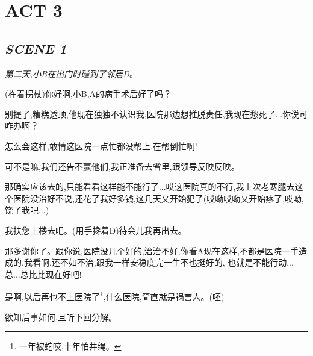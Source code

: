 \documentclass[11pt,a4paper,oneside]{memoir}  %
\begin{document}
\chapter*{ACT 3}

\section*{\hfill\textit{SCENE 1}}
\begin{description}[itemsep=1ex,leftmargin=1cm]
    \setlength{\parskip}{5pt}
    \item[] \hfill

    \textit{第二天,小\textup{B}在出门时碰到了邻居\textup{D}。}
    \item[邻居D] (杵着拐杖)你好啊,小B,A的病手术后好了吗？ 
    \item[小B] 别提了,糟糕透顶,他现在独独不认识我,医院那边想推脱责任,我现在愁死了...你说可咋办啊？
    \item[邻居D] 怎么会这样,敢情这医院一点忙都没帮上,在帮倒忙啊!
    \item[小B] 可不是嘛,我们还告不赢他们,我正准备去省里,跟领导反映反映。
    \item[邻居D] 那确实应该去的,只能看看这样能不能行了...哎这医院真的不行,我上次老寒腿去这个医院没治好不说,还花了我好多钱,这几天又开始犯了(哎呦哎呦又开始疼了,哎呦,饶了我吧...)
    \item[小B] 我扶您上楼去吧。(用手搀着\textup{D})待会儿我再出去。
    \item[邻居D] 那多谢你了。跟你说,医院没几个好的,治治不好,你看A现在这样,不都是医院一手造成的,我看啊,还不如不治,跟我一样安稳度完一生不也挺好的,
    也就是不能行动...总...总比比现在好吧!
    \item[小B] 是啊,以后再也不上医院了\footnote{一年被蛇咬,十年怕井绳。},什么医院,简直就是祸害人。(呸)
\end{description}
\vskip 1cm

\clearpage

\Huge{欲知后事如何,且听下回分解。}
\end{document}

